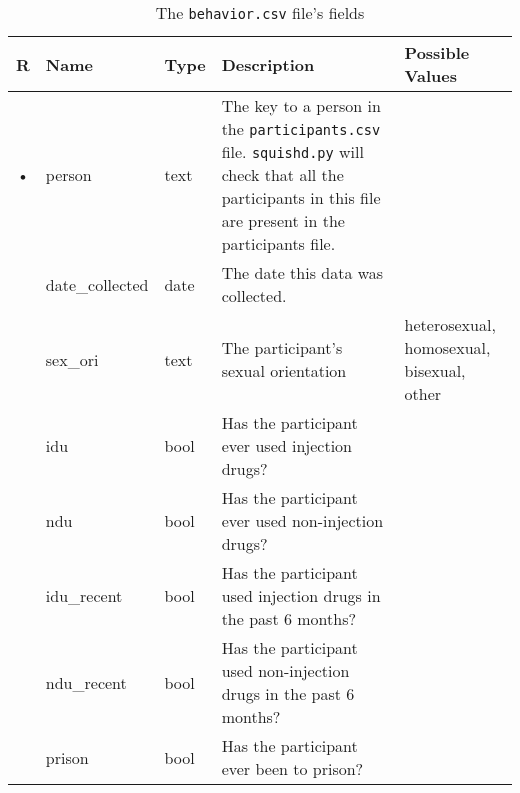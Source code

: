 \documentclass{article}
\begin{document}
\begin{table}[h!]
  \centering
  \caption{The \texttt{behavior.csv} file's fields}
  \label{tbl:behavior.csv}
  \begin{tabular}{cllp{6cm}p{4cm}}
    R & Name        & Type          & Description & Possible Values\\ \hline
    • & person      & text        &
    The key to a person in the \texttt{participants.csv}
    file. \texttt{squishd.py} will check that all the participants in
    this file are present in the participants file. \\
      & date\_collected & date      & The date this data was collected. \\
      & sex\_ori        & text    & The participant's sexual orientation & heterosexual, homosexual, bisexual, other \\
      & idu             & bool      & Has the participant ever used injection drugs? \\
      & ndu             & bool      & Has the participant ever used non-injection drugs? \\
      & idu\_recent     & bool      & Has the participant used injection drugs in the past 6 months? \\
      & ndu\_recent     & bool      & Has the participant used non-injection drugs in the past 6 months? \\    
      & prison          & bool      & Has the participant ever been to prison? \\
  \end{tabular}
\end{table}
\end{document}
